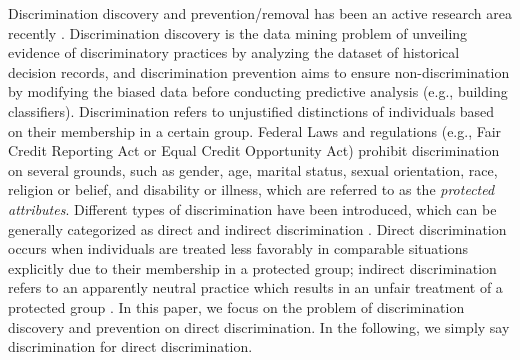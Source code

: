 \documentclass[twoside,leqno,twocolumn]{article}
\begin{document}
Discrimination discovery and prevention/removal has been an active research area recently \cite{hajian2013methodology,kamiran2012data,ruggieri2010data,romei2014multidisciplinary,feldman2015certifying}. Discrimination discovery is the data mining problem of unveiling evidence of discriminatory practices by analyzing the dataset of historical decision records, and discrimination prevention aims to ensure non-discrimination by modifying the biased data before conducting predictive analysis (e.g., building classifiers). Discrimination refers to unjustified distinctions of individuals based on their membership in a certain group. Federal Laws and regulations (e.g., Fair Credit Reporting Act or Equal Credit Opportunity Act) prohibit discrimination on several grounds, such as gender, age, marital status, sexual orientation, race, religion or belief, and disability or illness, which are referred to as the \emph{protected attributes}. Different types of discrimination have been introduced, which can be generally categorized as direct and indirect discrimination \cite{feldman2015certifying}. Direct discrimination occurs when individuals are treated less favorably in comparable situations explicitly due to their membership in a protected group; indirect discrimination refers to an apparently neutral practice which results in an unfair treatment of a protected group \cite{hajian2013methodology,romei2014multidisciplinary}. 
In this paper, we focus on the problem of discrimination discovery and prevention on direct discrimination. In the following, we simply say discrimination for direct discrimination.

\end{document}
